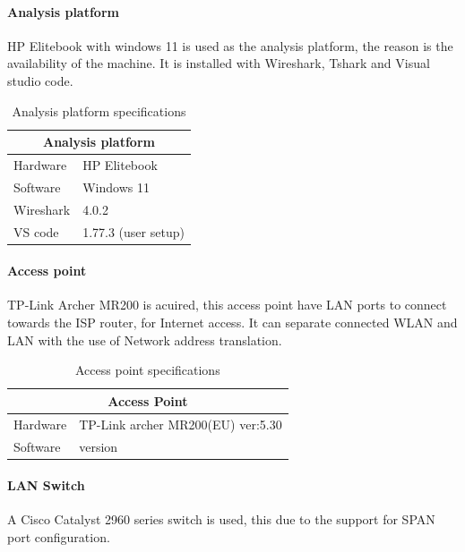 \paragraph{Analysis platform}
HP Elitebook with windows 11 is used as the analysis platform, the reason is the availability of the machine. It is installed with Wireshark, Tshark and Visual studio code. 

\begin{table}[H]
\centering
\caption{Analysis platform specifications}
\label{tab:AnalysisPlatfromSpec}
\begin{tabular}{|ll|}
\hline
\multicolumn{2}{|c|}{\textbf{Analysis platform}}      \\ \hline
\multicolumn{1}{|l|}{Hardware}  & HP Elitebook        \\ \hline
\multicolumn{1}{|l|}{Software}  & Windows 11          \\ \hline
\multicolumn{1}{|l|}{Wireshark} & 4.0.2               \\ \hline
\multicolumn{1}{|l|}{VS code}   & 1.77.3 (user setup) \\ \hline
\end{tabular}
\end{table}

\paragraph{Access point}
TP-Link Archer MR200 is acuired, this access point have LAN ports to connect towards the ISP router, for Internet access. It can separate connected WLAN and LAN with the use of Network address translation. 

\begin{table}[H]
\centering
\caption{Access point specifications}
\label{tab:AccessPointSpec}
\begin{tabular}{|ll|}
\hline
\multicolumn{2}{|c|}{\textbf{Access Point}}                        \\ \hline
\multicolumn{1}{|l|}{Hardware} & TP-Link archer MR200(EU) ver:5.30 \\ \hline
\multicolumn{1}{|l|}{Software} & version                           \\ \hline
\end{tabular}
\end{table}

\paragraph{LAN Switch}
A Cisco Catalyst 2960 series switch is used, this due to the support for SPAN port configuration. 

